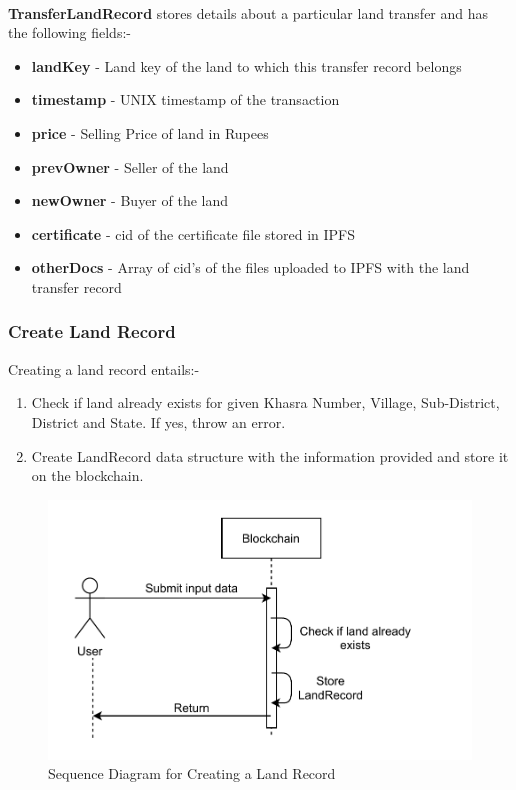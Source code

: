 \documentclass{article}
\begin{document}
        \paragraph{}
        \textbf{TransferLandRecord} stores details about a particular land transfer and has the following fields:-
        \begin{itemize}
            \item \textbf{landKey} - Land key of the land to which this transfer record belongs
            \item \textbf{timestamp} - UNIX timestamp of the transaction
            \item \textbf{price} - Selling Price of land in Rupees
            \item \textbf{prevOwner} - Seller of the land
            \item \textbf{newOwner} - Buyer of the land
            \item \textbf{certificate} - \gls{cid} of the certificate file stored in IPFS
            \item \textbf{otherDocs} - Array of \gls{cid}'s of the files uploaded to IPFS with the land transfer record
        \end{itemize}

    \subsubsection{Create Land Record}
        Creating a land record entails:-
        \begin{enumerate}
            \item Check if land already exists for given Khasra Number, Village, Sub-District, District and State. If yes, throw an error.
            \item Create LandRecord data structure with the information provided and store it on the blockchain.
        \end{enumerate}

        \begin{figure}[htbp]
            \includegraphics[scale=0.25]{blockchain_seq_create_land}
            \centering
            \caption{Sequence Diagram for Creating a Land Record}
        \end{figure}
\end{document}
